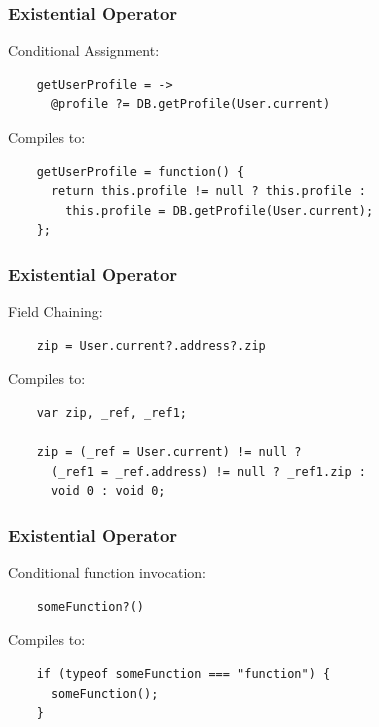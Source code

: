 \documentclass{beamer}
\begin{document}
%
%
 \begin{frame}[fragile]
  \frametitle{Existential Operator}


  Conditional Assignment:

  \begin{verbatim}
    getUserProfile = ->
      @profile ?= DB.getProfile(User.current)
  \end{verbatim}

  \pause
  \vspace{.5cm}
  Compiles to:
  \vspace{.5cm}


  \begin{verbatim}
    getUserProfile = function() {
      return this.profile != null ? this.profile : 
        this.profile = DB.getProfile(User.current);
    };
  \end{verbatim}  
\end{frame}

 \begin{frame}[fragile]
  \frametitle{Existential Operator}


  Field Chaining:

  \begin{verbatim}
    zip = User.current?.address?.zip
  \end{verbatim}

  \pause
  \vspace{.5cm}
  Compiles to:
  \vspace{.5cm}

  \begin{verbatim}
    var zip, _ref, _ref1;

    zip = (_ref = User.current) != null ? 
      (_ref1 = _ref.address) != null ? _ref1.zip : 
      void 0 : void 0;
  \end{verbatim}  
\end{frame}

 \begin{frame}[fragile]
  \frametitle{Existential Operator}

  Conditional function invocation:

  \begin{verbatim}
    someFunction?()
  \end{verbatim}

  \pause
  \vspace{.5cm}
  Compiles to:
  \vspace{.5cm}

  \begin{verbatim}
    if (typeof someFunction === "function") {
      someFunction();
    }
  \end{verbatim}  
\end{frame}
\end{document}
